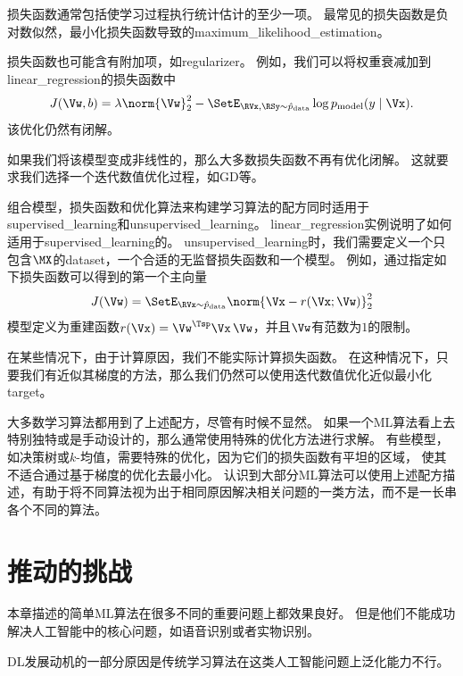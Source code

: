 
损失函数通常包括使学习过程执行统计估计的至少一项。
最常见的损失函数是负对数似然，最小化损失函数导致的\gls{maximum_likelihood_estimation}。

损失函数也可能含有附加项，如\gls{regularizer}。
例如，我们可以将权重衰减加到\gls{linear_regression}的损失函数中
\begin{equation}
    J(\Vw, b) = \lambda \norm{\Vw}_2^2 - \SetE_{\RVx,\RSy\sim \hat{p}_{\text{data}}}
    \log p_{\text{model}} (y \mid \Vx) .
\end{equation}
该优化仍然有闭解。

如果我们将该模型变成非线性的，那么大多数损失函数不再有优化闭解。
这就要求我们选择一个迭代数值优化过程，如\gls{GD}等。

组合模型，损失函数和优化算法来构建学习算法的配方同时适用于\gls{supervised_learning}和\gls{unsupervised_learning}。
\gls{linear_regression}实例说明了如何适用于\gls{supervised_learning}的。
\gls{unsupervised_learning}时，我们需要定义一个只包含$\MX$的\gls{dataset}，一个合适的无监督损失函数和一个模型。
例如，通过指定如下损失函数可以得到的第一个主向量
\begin{equation}
    J(\Vw) = \SetE_{\RVx \sim \hat{p}_{\text{data}}} \norm{\Vx - r(\Vx; \Vw)}_2^2
\end{equation}
模型定义为重建函数$r(\Vx) = \Vw^\Tsp\Vx \,\Vw$，并且$\Vw$有范数为$1$的限制。

在某些情况下，由于计算原因，我们不能实际计算损失函数。
在这种情况下，只要我们有近似其梯度的方法，那么我们仍然可以使用迭代数值优化近似最小化\gls{target}。

大多数学习算法都用到了上述配方，尽管有时候不显然。
如果一个\gls{ML}算法看上去特别独特或是手动设计的，那么通常使用特殊的优化方法进行求解。
有些模型，如决策树或$k$-均值，需要特殊的优化，因为它们的损失函数有平坦的区域，
使其不适合通过基于梯度的优化去最小化。
认识到大部分\gls{ML}算法可以使用上述配方描述，有助于将不同算法视为出于相同原因解决相关问题的一类方法，而不是一长串各个不同的算法。


\section{推动的挑战}
\label{sec:challenges_motivating_deep_learning}
本章描述的简单\gls{ML}算法在很多不同的重要问题上都效果良好。
但是他们不能成功解决人工智能中的核心问题，如语音识别或者实物识别。

\gls{DL}发展动机的一部分原因是传统学习算法在这类人工智能问题上泛化能力不行。

